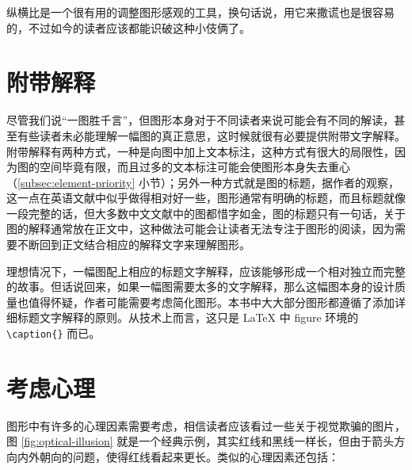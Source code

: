 \documentclass[
  b5paper,
  UTF8,twoside]{book}
\begin{document}
纵横比是一个很有用的调整图形感观的工具，换句话说，用它来撒谎也是很容易的，不过如今的读者应该都能识破这种小伎俩了。

\hypertarget{ux9644ux5e26ux89e3ux91ca}{%
\section{附带解释}\label{ux9644ux5e26ux89e3ux91ca}}

尽管我们说``一图胜千言''，但图形本身对于不同读者来说可能会有不同的解读，甚至有些读者未必能理解一幅图的真正意思，这时候就很有必要提供附带文字解释。附带解释有两种方式，一种是向图中加上文本标注，这种方式有很大的局限性，因为图的空间毕竟有限，而且过多的文本标注可能会使图形本身失去重心（\ref{subsec:element-priority} 小节）；另外一种方式就是图的标题，据作者的观察，这一点在英语文献中似乎做得相对好一些，图形通常有明确的标题，而且标题就像一段完整的话，但大多数中文文献中的图都惜字如金，图的标题只有一句话，关于图的解释通常放在正文中，这种做法可能会让读者无法专注于图形的阅读，因为需要不断回到正文结合相应的解释文字来理解图形。

理想情况下，一幅图配上相应的标题文字解释，应该能够形成一个相对独立而完整的故事。但话说回来，如果一幅图需要太多的文字解释，那么这幅图本身的设计质量也值得怀疑，作者可能需要考虑简化图形。本书中大大部分图形都遵循了添加详细标题文字解释的原则。从技术上而言，这只是 LaTeX 中 figure 环境的 \texttt{\textbackslash{}caption\{\}} 而已。

\hypertarget{sec:psychology}{%
\section{考虑心理}\label{sec:psychology}}

图形中有许多的心理因素需要考虑，相信读者应该看过一些关于视觉欺骗的图片，图 \ref{fig:optical-illusion} 就是一个经典示例，其实红线和黑线一样长，但由于箭头方向内外朝向的问题，使得红线看起来更长。类似的心理因素还包括：
\end{document}
